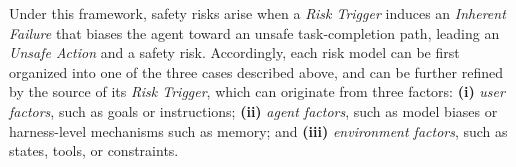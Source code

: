 Under this framework, safety risks arise when a \textit{Risk Trigger} induces an \textit{Inherent Failure} that biases the agent toward an unsafe task-completion path, leading an \textit{Unsafe Action} and a safety risk. 
Accordingly, each risk model can be first organized into one of the three cases described above, and can be further refined by the source of its \textit{Risk Trigger}, which can originate from three factors: \textbf{(i)} \textit{user factors}, such as goals or instructions; \textbf{(ii)} \textit{agent factors}, such as model biases or harness-level mechanisms such as memory; and \textbf{(iii)} \textit{environment factors}, such as states, tools, or constraints. 

































